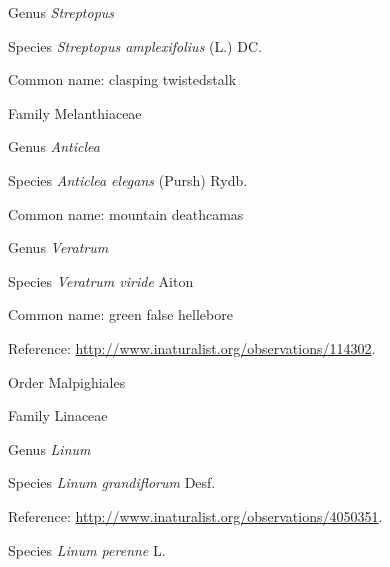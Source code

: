 \documentclass[9pt, article]{memoir}
\begin{document}
\begin{multicols}{2}
\vspace{6pt}\noindent\hspace{30pt}Genus \textit{Streptopus}


\vspace{6pt}\noindent\hspace{36pt}Species \textit{Streptopus amplexifolius} (L.) DC.


Common name: clasping twistedstalk

\vspace{6pt}\noindent\hspace{24pt}Family Melanthiaceae


\vspace{6pt}\noindent\hspace{30pt}Genus \textit{Anticlea}


\vspace{6pt}\noindent\hspace{36pt}Species \textit{Anticlea elegans} (Pursh) Rydb.


Common name: mountain deathcamas

\vspace{6pt}\noindent\hspace{30pt}Genus \textit{Veratrum}


\vspace{6pt}\noindent\hspace{36pt}Species \textit{Veratrum viride} Aiton


Common name: green false hellebore

Reference: 
\url{http://www.inaturalist.org/observations/114302}.

\vspace{6pt}\noindent\hspace{18pt}Order Malpighiales


\vspace{6pt}\noindent\hspace{24pt}Family Linaceae


\vspace{6pt}\noindent\hspace{30pt}Genus \textit{Linum}


\vspace{6pt}\noindent\hspace{36pt}Species \textit{Linum grandiflorum} Desf.


Reference: 
\url{http://www.inaturalist.org/observations/4050351}.

\vspace{6pt}\noindent\hspace{36pt}Species \textit{Linum perenne} L.



\end{multicols}
\end{document}
